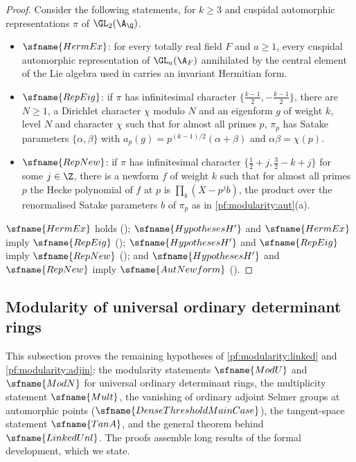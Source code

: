 \begin{proof}
Consider the following statements, for $k\ge3$ and cuspidal automorphic representations $\pi$ of $\GL_2(\A_\Q)$.
\begin{itemize}
\item $\sfname{HermEx}$: for every totally real field $F$ and $a\ge1$, every cuspidal automorphic representation of
$\GL_a(\A_F)$ annihilated by the central element of the Lie algebra used in \cite{LeanSource2026} carries an invariant
Hermitian form.
\item $\sfname{RepEig}$: if $\pi$ has infinitesimal character $\{\frac{k-1}2,-\frac{k-1}2\}$, there are $N\ge1$, a
Dirichlet character $\chi$ modulo $N$ and an eigenform $g$ of weight $k$, level $N$ and character $\chi$ such that for almost
all primes $p$, $\pi_p$ has Satake parameters $\{\alpha,\beta\}$ with $a_p(g)=p^{(k-1)/2}(\alpha+\beta)$ and
$\alpha\beta=\chi(p)$.
\item $\sfname{RepNew}$: if $\pi$ has infinitesimal character $\{\frac12+j,\frac32-k+j\}$ for some $j\in\Z$, there is a
newform $f$ of weight $k$ such that for almost all primes $p$ the Hecke polynomial of $f$ at $p$ is
$\prod_b(X-p^jb)$, the product over the renormalised Satake parameters $b$ of $\pi_p$ as in \cref{pf:modularity:aut}(a).
\end{itemize}
$\sfname{HermEx}$ holds (); $\sfname{HypothesesH'}$ and $\sfname{HermEx}$ imply
$\sfname{RepEig}$ (); $\sfname{HypothesesH'}$ and $\sfname{RepEig}$
imply $\sfname{RepNew}$ (); and $\sfname{HypothesesH'}$ and
$\sfname{RepNew}$ imply $\sfname{AutNewform}$ ().
\end{proof}

\subsection{Modularity of universal ordinary determinant rings}\label{sec:pf:modularity:modU}

This subsection proves the remaining hypotheses of \cref{pf:modularity:linked} and \cref{pf:modularity:adjin}: the
modularity statements $\sfname{ModU}$ and $\sfname{ModN}$ for universal ordinary determinant rings, the multiplicity
statement $\sfname{Mult}$, the vanishing of ordinary adjoint Selmer groups at automorphic points
($\sfname{DenseThresholdMainCase}$), the tangent-space statement $\sfname{TanA}$, and the general theorem behind
$\sfname{LinkedUnl}$. The proofs assemble long results of the formal development, which we state.


